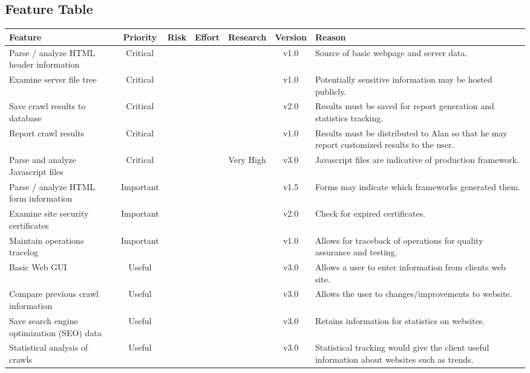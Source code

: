 \subsection{Feature Table}
\begin{tabularx}{\textwidth}{|X|c|c|c|c|c|X|}
	\hline
	\bf Feature &\bf Priority &\bf Risk &\bf Effort &\bf Research &\bf Version &\bf Reason \\ \hline
	Parse / analyze HTML header information & Critical & \lw & \md & \md & v1.0 & Source of basic webpage and server data. \\ \hline
	Examine server file tree & Critical & \md & \lw & \lw & v1.0 & Potentially sensitive information may be hosted publicly. \\ \hline
	Save crawl results to database & Critical & \md & \hh & \lw &v2.0 & Results must be saved for report generation and statistics tracking. \\ \hline
	Report crawl results & Critical & \hh & \md & \md &v1.0 & Results must be distributed to Alan so that he may report customized results to the user. \\ \hline
	Parse and analyze Javascript files & Critical & \lw & \hh & Very High &v3.0 & Javascript files are indicative of production framework. \\ \hline
	Parse / analyze HTML form information & Important & \lw & \hh & \hh &v1.5  & Forms may indicate which frameworks generated them. \\ \hline
	Examine site security certificates & Important & \md & \lw & \md &v2.0 & Check for expired certificates. \\ \hline
	Maintain operations tracelog & Important & \hh & \lw & \lw &v1.0 & Allows for traceback of operations for quality assurance and testing. \\ \hline
	Basic Web GUI & Useful & \lw & \lw & \lw &v3.0 & Allows a user to enter information from clients web site. \\ \hline
	Compare previous crawl information & Useful & \lw & \hh & \md &v3.0 & Allows the user to changes/improvements to website. \\ \hline
	Save search engine optimization (SEO) data & Useful & \lw & \lw & \md & v3.0 & Retains information for statistics on websites. \\ \hline
	Statistical analysis of crawls & Useful & \md & \hh & \md &v3.0 & Statistical tracking would give the client useful information about websites such as trends. \\ \hline
\end{tabularx}
\newpage
